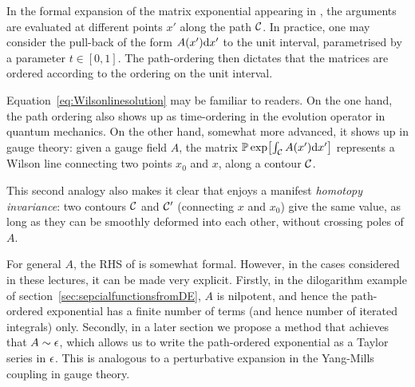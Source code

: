 In the formal expansion of the matrix exponential appearing in , the arguments are evaluated at different points $x'$ along the path ${\cal C}$. In practice, one may consider the pull-back of the form $A(x') \mathrm{d} x'$ to the unit interval, parametrised by a parameter $t\in [0,1]$. 
The path-ordering then dictates that the matrices are ordered according to the ordering on the unit interval.


Equation~\eqref{eq:Wilsonlinesolution} may be familiar to readers. On the one hand, the path ordering also shows up as time-ordering in the evolution operator in quantum mechanics. On the other hand, somewhat more advanced, it shows up in gauge theory: given a gauge field $A$, the matrix  $ {\mathbb P} \exp\bigl[ \int_{\cal C} A(x') \mathrm{d} x' \bigr]$ represents a Wilson line connecting two points $x_0$ and $x$, along a contour ${\cal C}$. 

This second analogy also makes it clear that  enjoys a manifest {\it homotopy invariance}: two contours ${\cal C}$ and ${\cal C'}$ (connecting $x$ and $x_0$) give the same value, as long as they can be smoothly deformed into each other, without crossing poles of $A$.

For general $A$, the RHS of  is somewhat formal. However, in the cases considered  in these lectures, it can be made very explicit. Firstly, in the dilogarithm example of section~\ref{sec:sepcialfunctionsfromDE}, $A$ is nilpotent, and hence the path-ordered exponential has a finite number of terms (and hence number of iterated integrals) only. Secondly, in a later section we propose a method that achieves that $A \sim \epsilon$, which allows us to write the path-ordered exponential as a Taylor series in $\epsilon$. This is analogous to a perturbative expansion in the Yang-Mills coupling in gauge theory.

\smallskip

